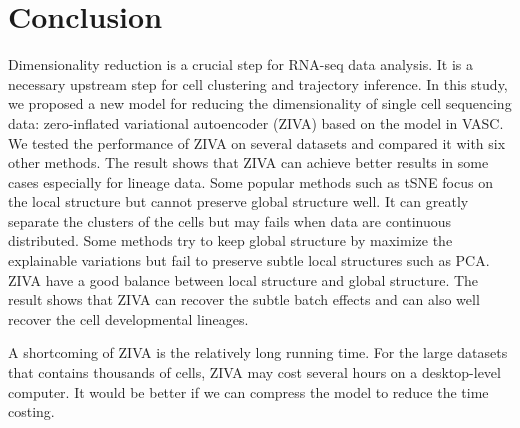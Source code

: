 \section{Conclusion}
Dimensionality reduction is a crucial step for RNA-seq data analysis. It is a necessary upstream step for cell clustering and trajectory inference. In this study, we proposed a new model for reducing the dimensionality of single cell sequencing data: zero-inflated variational autoencoder (ZIVA) based on the model in VASC. We tested the performance of ZIVA on several datasets and compared it with six other methods. The result shows that ZIVA can achieve better results in some cases especially for lineage data. Some popular methods such as tSNE focus on the local structure but cannot preserve global structure well. It can greatly separate the clusters of the cells but may fails when data are continuous distributed. Some methods try to keep global structure by maximize the explainable variations but fail to preserve subtle local structures such as PCA. ZIVA have a good balance between local structure and global structure. The result shows that ZIVA can recover the subtle batch effects and can also well recover the cell developmental lineages.

A shortcoming of ZIVA is the relatively long running time. For the large datasets that contains thousands of cells, ZIVA may cost several hours on a desktop-level computer. It would be better if we can compress the model to reduce the time costing.
